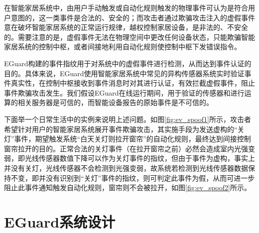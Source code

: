 在智能家居系统中，由用户手动触发或自动化规则触发的物理事件可认为是符合用户意图的，这一类事件是合法的、安全的；而攻击者通过欺骗攻击注入的虚假事件意在破坏智能家居系统的正常运行规律，越权控制家居设备，是非法的、不安全的。需要注意的是，虚假事件无法在物理空间中更改任何设备状态，只能欺骗智能家居系统的控制中枢，或者间接地利用自动化规则使控制中枢下发错误指令。

EGuard构建的事件指纹用于对系统中的虚假事件进行检测，从而达到事件认证的目的。具体来说，EGuard使用智能家居系统中常见的异构传感器系统实时验证事件真实性，在控制中枢接收到事件消息时对其进行认证，有效拦截虚假事件，阻止事件欺骗攻击发生。我们假设EGuard在线运行期间，用于验证的传感器和进行运算的相关服务器是可信的，而智能设备报告的原始事件是不可信的。

下面举一个日常生活中的实例来说明上述问题。如图\ref{fig:ev_spoof1}所示，攻击者希望针对用户的智能家居系统展开事件欺骗攻击，其实施手段为发送虚构的“关灯”事件，期望触发系统“白天关灯则拉开窗帘”的自动化规则，最终达到间接控制窗帘拉开的目的。正常合法的关灯事件（在拉开窗帘之前）必然会造成室内光强变弱，即光线传感器数值下降可以作为关灯事件的指纹，但由于事件为虚构，事实上并没有关灯，光线传感器不会检测到光强变弱，故系统若检测到光线传感器数据保持不变，即并没有识别到“关灯”事件的指纹，则可判定此事件为假，从而可进一步阻止此事件通知触发自动化规则，窗帘则不会被拉开，如图\ref{fig:ev_spoof2}所示。

\section{EGuard系统设计}

